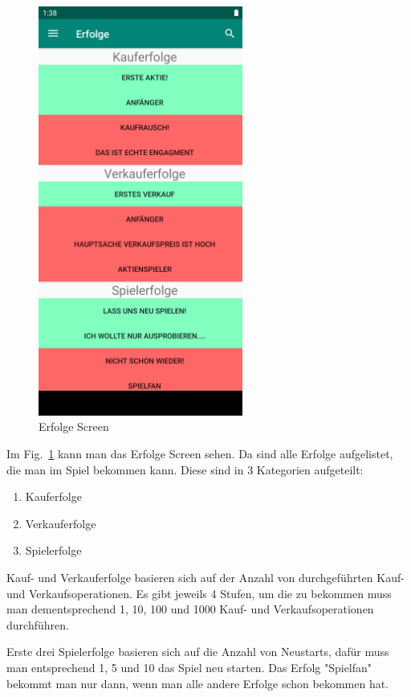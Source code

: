 \documentclass[10pt]{scrartcl}
\begin{document}
\begin{figure}[H]
	\centering
	\includegraphics[width=0.6\textwidth]{Bilder/Applikation/erfolge.png}
	 \caption{Erfolge Screen}
	 \label{erfolge1}
\end{figure}

Im Fig.~\ref{erfolge1} kann man das Erfolge Screen sehen. Da sind alle Erfolge aufgelistet, die man im Spiel bekommen kann. Diese sind in 3 Kategorien aufgeteilt:
 \begin{enumerate}
 	\item Kauferfolge
 	\item Verkauferfolge
 	\item Spielerfolge
 \end{enumerate}
Kauf- und Verkauferfolge basieren sich auf der Anzahl von durchgeführten Kauf- und Verkaufsoperationen. Es gibt jeweils 4 Stufen, um die zu bekommen muss man dementsprechend 1, 10, 100 und 1000 Kauf- und Verkaufsoperationen durchführen.

Erste drei Spielerfolge basieren sich auf die Anzahl von Neustarts, dafür muss man entsprechend 1, 5 und 10 das Spiel neu starten. Das Erfolg "Spielfan" bekommt man nur dann, wenn man alle andere Erfolge schon bekommen hat.
\end{document}
